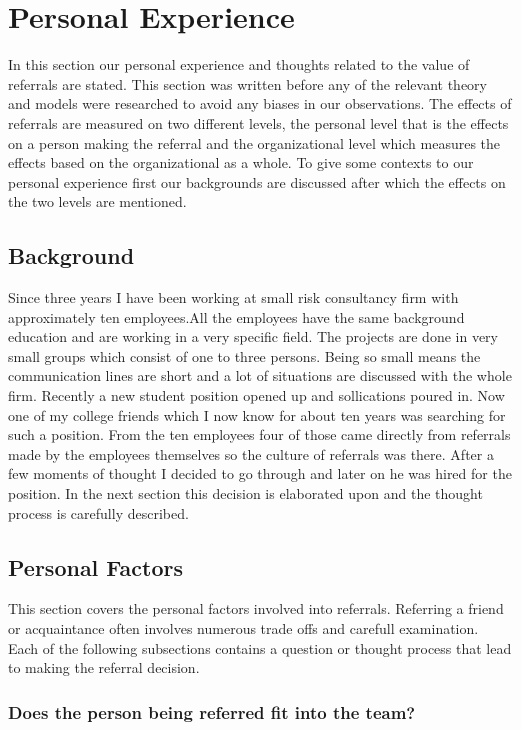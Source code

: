 \documentclass[a4paper, 11pt]{article} %
\begin{document}
\section*{Personal Experience}
In this section our personal experience and thoughts related to the value of referrals are stated. This section was written before any of the relevant theory and models were researched to avoid any biases in our observations. The effects of referrals are measured on two different levels, the personal level that is the effects on a person making the referral and the organizational level which measures the effects based on the organizational as a whole. To give some contexts to our personal experience first our backgrounds are discussed after which the effects on the two levels are mentioned.

\subsection*{Background}

 Since three years I have been working at small risk consultancy firm with approximately ten employees.All the employees have the same background education and are working in a very specific field. The projects are done in very small groups which consist of one to three persons. Being so small means the communication lines are short and a lot of situations are discussed with the whole firm. Recently a new student position opened up and sollications poured in.  Now one of my college friends which I now know for about ten years was searching for such a position. From the ten employees four of those came directly from referrals made by the employees themselves so the culture of referrals was there. After a few moments of thought I decided to go through and later on he was hired for the position. In the next section this decision is elaborated upon and the thought process is carefully described. 

\subsection*{Personal Factors}

This section covers the personal factors involved into referrals. Referring a friend or acquaintance often involves numerous trade offs and carefull examination. Each of the following subsections contains a question or thought process that lead to making the referral decision.

\subsubsection*{Does the person being referred fit into the team?}
\end{document}
